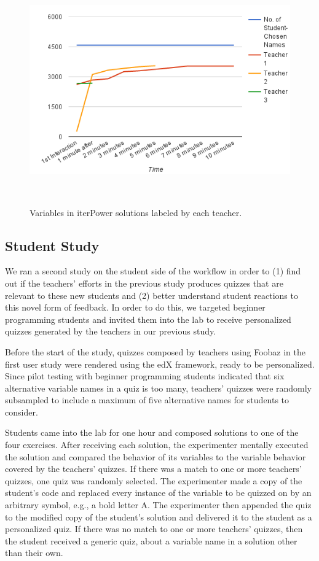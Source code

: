 \begin{figure}
\begin{minipage}{1\columnwidth}
\centering
\includegraphics[width=0.9\columnwidth]{Body/figures/foobaz/variableCoverageNoTitle.png}
\caption{Variables in iterPower solutions labeled by each teacher.}~\label{fig:variableCoverage}
\end{minipage}
\end{figure}

\subsection{Student Study}

We ran a second study on the student side of the workflow in order to (1) find out if the teachers' efforts in the previous study produces quizzes that are relevant to these new students and (2) better understand student reactions to this novel form of feedback. In order to do this, we targeted beginner programming students and invited them into the lab to receive personalized quizzes generated by the teachers in our previous study.

Before the start of the study, quizzes composed by teachers using Foobaz in the first user study were rendered using the edX framework, ready to be personalized. Since pilot testing with beginner programming students indicated that six alternative variable names in a quiz is too many, teachers' quizzes were randomly subsampled to include a maximum of five alternative names for students to consider. 

Students came into the lab for one hour and composed solutions to one of the four exercises. After receiving each solution, the experimenter mentally executed the solution and compared the behavior of its variables to the variable behavior covered by the teachers' quizzes. If there was a match to one or more teachers' quizzes, one quiz was randomly selected. The experimenter made a copy of the student's code and replaced every instance of the variable to be quizzed on by an arbitrary symbol, e.g., a bold letter A. The experimenter then appended the quiz to the modified copy of the student's solution and delivered it to the student as a personalized quiz. If there was no match to one or more teachers' quizzes, then the student received a generic quiz, about a variable name in a solution other than their own.

